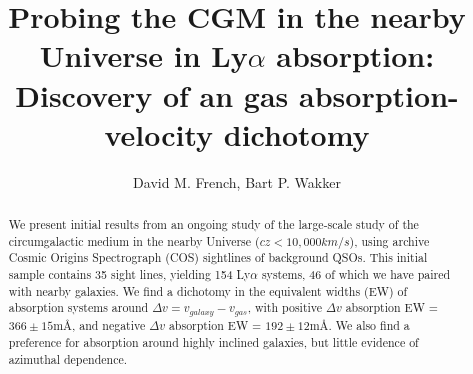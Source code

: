 \documentclass[iop]{emulateapj-rtx4}
\begin{document}

\title{Probing the CGM in the nearby Universe in Ly$\alpha$ absorption: Discovery of an gas absorption-velocity dichotomy}
\author{David M. French, Bart P. Wakker}



\begin{abstract}

We present initial results from an ongoing study of the large-scale study of the circumgalactic medium in the nearby Universe ($cz < 10,000 km/s$), using archive Cosmic Origins Spectrograph (COS) sightlines of background QSOs. This initial sample contains 35 sight lines, yielding 154 Ly$\alpha$ systems, 46 of which we have paired with nearby galaxies. We find a dichotomy in the equivalent widths (EW) of absorption systems around $\Delta v = v_{galaxy} - v_{gas}$, with positive $\Delta v$ absorption EW = $366 \pm 15$m\AA, and negative $\Delta v$  absorption EW = $192 \pm 12$m\AA. We also find a preference for absorption around highly inclined galaxies, but little evidence of azimuthal dependence.



\end{abstract}


%
%
%
 
\end{document}

